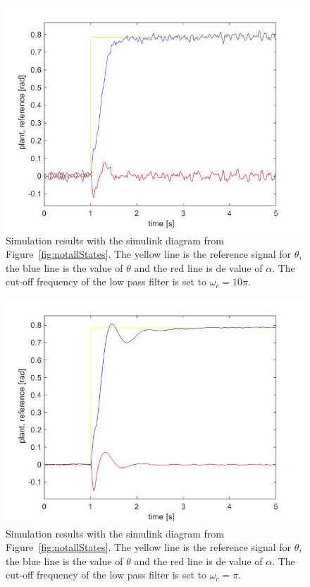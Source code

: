 \documentclass[ twoside,openright,titlepage,numbers=noenddot,headinclude,%
                footinclude=true,cleardoublepage=empty,abstractoff, %
                BCOR=5mm,paper=a4,fontsize=11pt,%
                ngerman,american,%
                ]{scrreprt}
\begin{document}
{{\begin{figure}
\includegraphics[scale=0.5]{images/sim_results2}
\caption{Simulation results with the simulink diagram from Figure~\ref{fig:notallStates}. The yellow line is the reference signal for $\theta$, the blue line is the value of $\theta$ and the red line is de value of $\alpha$. The cut-off frequency of the low pass filter is set to $\omega_c = 10\pi$. }
\label{fig:sim_results2}
\end{figure}

\begin{figure}
\includegraphics[scale=0.5]{images/sim_results3}
\caption{Simulation results with the simulink diagram from Figure~\ref{fig:notallStates}. The yellow line is the reference signal for $\theta$, the blue line is the value of $\theta$ and the red line is de value of $\alpha$. The cut-off frequency of the low pass filter is set to $\omega_c = \pi$. }
\label{fig:sim_results3}
\end{figure}



}}
\end{document}
